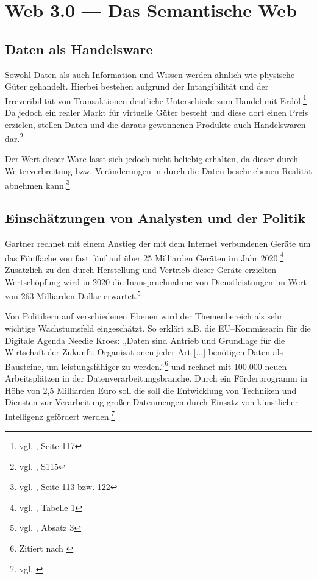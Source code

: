 \section{Web 3.0 --- Das Semantische Web}
\label{sec:hauptteil}

\subsection{Daten als Handelsware}
\label{handelsware}

Sowohl Daten als auch Information und Wissen werden ähnlich wie physische Güter gehandelt. Hierbei bestehen aufgrund der Intangibilität und der Irreveribilität von Transaktionen deutliche Unterschiede zum Handel mit Erdöl.\footnote{vgl. \cite{wiener}, Seite 117} Da jedoch ein realer Markt für virtuelle Güter besteht und diese dort einen Preis erzielen, stellen Daten und die daraus gewonnenen Produkte auch Handelswaren dar.\footnote{vgl. \cite{wiener}, S115}

Der Wert dieser Ware lässt sich jedoch nicht beliebig erhalten, da dieser durch Weiterverbreitung bzw. Veränderungen in durch die Daten beschriebenen Realität abnehmen kann.\footnote{vgl. \cite{wiener}, Seite 113 bzw. 122}

\subsection{Einschätzungen von Analysten und der Politik}
\label{politik}

Gartner rechnet mit einem Anstieg der mit dem Internet verbundenen Geräte um das Fünffache  von fast fünf auf über 25 Milliarden Geräten im Jahr 2020.\footnote{vgl. \cite{gartneriot}, Tabelle 1} Zusätzlich zu den durch Herstellung und Vertrieb dieser Geräte erzielten Wertschöpfung wird in 2020 die Inanspruchnahme von Dienstleistungen im Wert von 263 Milliarden Dollar erwartet.\footnote{vgl. \cite{gartneriot}, Absatz 3}

Von Politikern auf verschiedenen Ebenen wird der Themenbereich  als sehr wichtige Wachstumsfeld eingeschätzt. So erklärt z.B. die EU--Kommissarin für die Digitale Agenda Needie Kroes: „Daten sind Antrieb und Grundlage für die Wirtschaft der Zukunft. Organisationen jeder Art [...] benötigen Daten als Bausteine, um leistungsfähiger zu werden.“\footnote{Zitiert nach \cite{bd25}} und rechnet mit 100.000 neuen Arbeitsplätzen in der Datenverarbeitungsbranche. Durch ein Förderprogramm in Höhe von 2,5 Milliarden Euro soll die soll die Entwicklung von Techniken und Diensten zur Verarbeitung großer Datenmengen durch Einsatz von künstlicher Intelligenz gefördert werden.\footnote{vgl. \cite{bd25}}

